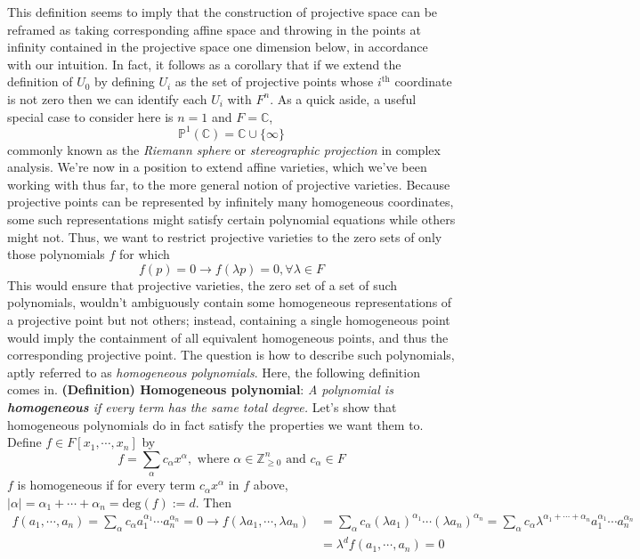 \documentclass{article}
\newcommand*{\tb}{\textbf}
\newcommand*{\ti}{\textit}
\newcommand*{\n}{\newline}
\newcommand*{\nn}{\newline \newline}
\newcommand*{\Fx}{\ensuremath{F[x_1, \cdots, x_n]}}
\begin{document}
This definition seems to imply that the construction of projective space can be reframed as taking corresponding affine space and throwing in the points at infinity contained in the projective space one dimension below, in accordance with our intuition. In fact, it follows as a corollary that if we extend the definition of $ U_0 $ by defining $ U_i $ as the set of projective points whose $ i^{\text{th}} $ coordinate is not zero then we can identify each $ U_i $ with $ F^n $.
\n
As a quick aside, a useful special case to consider here is $ n = 1 $ and $ F = \mathbb{C} $,
$$ \mathbb{P}^1(\mathbb{C}) = \mathbb{C} \cup \{ \infty \} $$
commonly known as the \ti{Riemann sphere} or \ti{stereographic projection} in complex analysis.
\n
We're now in a position to extend affine varieties, which we've been working with thus far, to the more general notion of projective varieties. Because projective points can be represented by infinitely many homogeneous coordinates, some such representations might satisfy certain polynomial equations while others might not. Thus, we want to restrict projective varieties to the zero sets of only those polynomials $ f $ for which
$$ f(p) = 0 \rightarrow f(\lambda p) = 0, \forall \lambda \in F $$
This would ensure that projective varieties, the zero set of a set of such polynomials, wouldn't ambiguously contain some homogeneous representations of a projective point but not others; instead, containing a single homogeneous point would imply the containment of all equivalent homogeneous points, and thus the corresponding projective point. The question is how to describe such polynomials, aptly referred to as \ti{homogeneous polynomials}. Here, the following definition comes in.
\nn
\tb{(Definition) Homogeneous polynomial}: \ti{A polynomial is \tb{homogeneous} if every term has the same total degree.}
\nn
Let's show that homogeneous polynomials do in fact satisfy the properties we want them to. Define $ f \in \Fx $ by
$$ f = \sum_\alpha c_\alpha x^\alpha, \text{ where } \alpha \in \mathbb{Z}_{\geq 0}^n \text{ and } c_\alpha \in F $$
$ f $ is homogeneous if for every term $ c_\alpha x^\alpha $ in $ f $ above, $ | \alpha | = \alpha_1 + \cdots + \alpha_n = \text{deg}(f) := d $. Then
$$ \begin{aligned}
    f(a_1, \cdots, a_n) = \sum_\alpha c_\alpha a_1^{\alpha_1} \cdots a_n^{\alpha_n} = 0 \rightarrow f(\lambda a_1, \cdots, \lambda a_n) &= \sum_\alpha c_\alpha (\lambda a_1)^{\alpha_1} \cdots (\lambda a_n)^{\alpha_n} = \sum_\alpha c_\alpha \lambda^{\alpha_1 + \cdots + \alpha_n} a_1^{\alpha_1} \cdots a_n^{\alpha_n} \\
    &= \lambda^d f(a_1, \cdots, a_n) = 0
\end{aligned} $$
\end{document}
